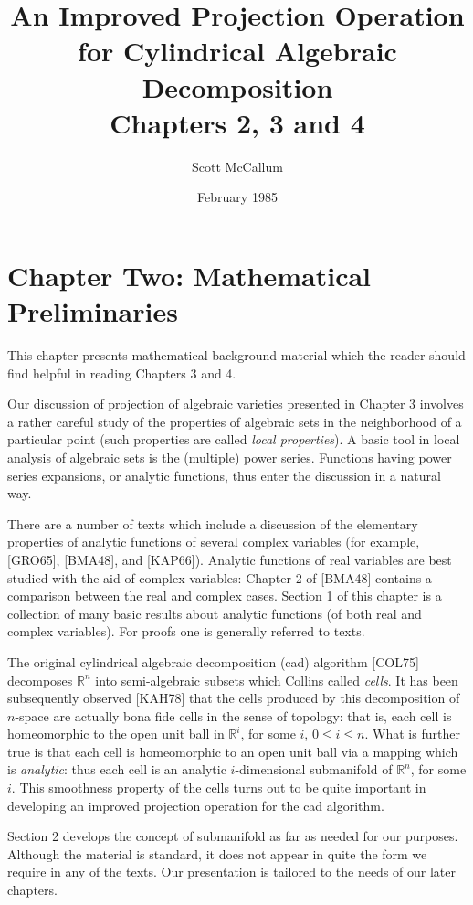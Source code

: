 \documentclass[11pt]{article}
\title{An Improved Projection Operation\\for Cylindrical Algebraic Decomposition\\[1em]\large Chapters 2, 3 and 4}
\author{Scott McCallum}
\date{February 1985}
\theoremstyle{plain}
\theoremstyle{definition}
\newcommand{\R}{\mathbb{R}}
\begin{document}
\maketitle

\section*{Chapter Two: Mathematical Preliminaries}

This chapter presents mathematical background material which the reader
should find helpful in reading Chapters 3 and 4.

Our discussion of projection of algebraic varieties presented in Chapter 3
involves a rather careful study of the properties of algebraic sets in the
neighborhood of a particular point (such properties are called
\emph{local properties}). A basic tool in local analysis of algebraic sets
is the (multiple) power series. Functions having power series expansions,
or analytic functions, thus enter the discussion in a natural way.

There are a number of texts which include a discussion of the elementary
properties of analytic functions of several complex variables (for
example, [GRO65], [BMA48], and [KAP66]). Analytic functions of real
variables are best studied with the aid of complex variables: Chapter 2 of
[BMA48] contains a comparison between the real and complex cases.
Section 1 of this chapter is a collection of many basic results about
analytic functions (of both real and complex variables). For proofs one is
generally referred to texts.

The original cylindrical algebraic decomposition (cad) algorithm [COL75]
decomposes $\R^n$ into semi-algebraic subsets which Collins called
\emph{cells}. It has been subsequently observed [KAH78] that the cells
produced by this decomposition of $n$-space are actually bona fide cells
in the sense of topology: that is, each cell is homeomorphic to the open
unit ball in $\R^i$, for some $i$, $0 \le i \le n$. What is further true
is that each cell is homeomorphic to an open unit ball via a mapping which
is \emph{analytic}: thus each cell is an analytic $i$-dimensional
submanifold of $\R^n$, for some $i$. This smoothness property of the cells
turns out to be quite important in developing an improved projection
operation for the cad algorithm.

Section 2 develops the concept of submanifold as far as needed for our
purposes. Although the material is standard, it does not appear in quite
the form we require in any of the texts. Our presentation is tailored to
the needs of our later chapters.
\end{document}

